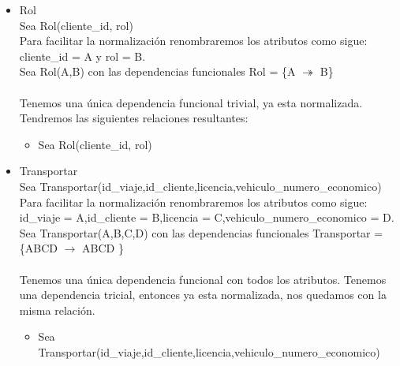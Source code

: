 \documentclass{article}
\begin{document}
\begin{itemize}
\item Rol\\
Sea Rol(cliente\_id, rol)\\
Para facilitar la normalización renombraremos los atributos como sigue:
cliente\_id = A y rol = B.\\
Sea Rol(A,B) con las dependencias funcionales
Rol = \{A $\twoheadrightarrow$ B\} \\
\\
Tenemos una única dependencia funcional trivial, ya esta normalizada.
Tendremos las siguientes relaciones resultantes:
\begin{itemize}
\item Sea Rol(cliente\_id, rol)\\
\end{itemize}

\item Transportar\\
Sea Transportar(id\_viaje,id\_cliente,licencia,vehiculo\_numero\_economico)\\
Para facilitar la normalización renombraremos los atributos como sigue:
id\_viaje = A,id\_cliente = B,licencia = C,vehiculo\_numero\_economico = D.\\
Sea Transportar(A,B,C,D) con las dependencias funcionales
Transportar = \{ABCD $\rightarrow$ ABCD \} \\
\\
Tenemos una única dependencia funcional con todos los atributos. Tenemos
una dependencia tricial, entonces ya esta normalizada, nos quedamos con la
misma relación.
\begin{itemize}
\item Sea Transportar(id\_viaje,id\_cliente,licencia,vehiculo\_numero\_economico) \\
\end{itemize}
\end{itemize}
\end{document}
